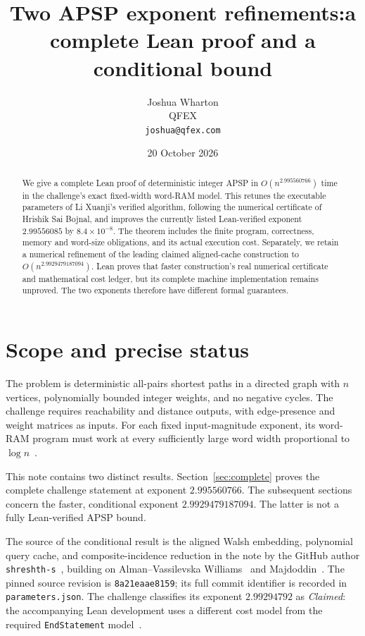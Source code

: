 \documentclass[11pt,a4paper]{article}
\title{Two APSP exponent refinements:\newline a complete Lean proof and a conditional bound}
\author{Joshua Wharton\\QFEX\\\texttt{joshua@qfex.com}}
\date{20 October 2026}
\begin{document}
\maketitle
\thispagestyle{empty}
\vspace{-12pt}
\begin{abstract}
We give a complete Lean proof of deterministic integer APSP in
$O(n^{2.995560766})$ time in the challenge's exact fixed-width word-RAM
model. This retunes the executable parameters of Li Xuanji's verified
algorithm, following the numerical certificate of Hrishik Sai Bojnal,
and improves the currently listed Lean-verified exponent $2.99556085$
by $8.4\times10^{-8}$. The theorem includes the finite program,
correctness, memory and word-size obligations, and its actual execution
cost. Separately, we retain a numerical refinement of the leading
claimed aligned-cache construction to $O(n^{2.9929479187094})$.
Lean proves that faster construction's real numerical certificate and
mathematical cost ledger, but its complete machine implementation remains
unproved. The two exponents therefore have different formal guarantees.
\end{abstract}

\section{Scope and precise status}
The problem is deterministic all-pairs shortest paths in a directed graph
with $n$ vertices, polynomially bounded integer weights, and no negative
cycles. The challenge requires reachability and distance outputs, with
edge-presence and weight matrices as inputs. For each fixed input-magnitude
exponent, its word-RAM program must work at every sufficiently large word
width proportional to $\log n$~\cite{race}.

This note contains two distinct results. Section~\ref{sec:complete} proves
the complete challenge statement at exponent $2.995560766$. The subsequent
sections concern the faster, conditional exponent $2.9929479187094$.
The latter is not a fully Lean-verified APSP bound.

The source of the conditional result is the aligned Walsh embedding, polynomial query cache, and
composite-incidence reduction in the note by the GitHub author
\texttt{shreshth-s}~\cite{base}, building on
Alman--Vassilevska Williams~\cite{avw} and Majdoddin~\cite{majd}.
The pinned source revision is \texttt{8a21eaae8159}; its full commit
identifier is recorded in \texttt{parameters.json}.
The challenge classifies its exponent $2.99294792$ as \emph{Claimed}:
the accompanying Lean development uses a different cost model from the
required \texttt{EndStatement} model~\cite{race}.
\end{document}
